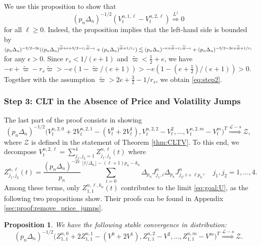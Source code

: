 \documentclass[ecta,nameyear,draft]{econsocart}
\newtheorem{prop}[theorem]{Proposition}
\def\wt{\widetilde}
\newcommand{\limL}{\stackrel{L^1}{\Longrightarrow}}
\newcommand{\1}{\mathbf 1}
\newcommand{\calL}{\mathcal{L}}
\newcommand{\calZ}{\mathcal{Z}}
\numberwithin{equation}{section}
\begin{document}
\begin{appendix}
We use this proposition to show that
\begin{equation}\label{eq:step2} 
	(p_n\Delta_n)^{-1/2} (V^{n,1,\ell}_t -   V^{n,2,\ell}_t) \limL 0
\end{equation}
for all $\ell \geq 0$. Indeed, the proposition implies that the left-hand side is bounded by
$
(p_n\Delta_n)^{-3/2-2e} 
(
	(p_n\Delta_n)^{\wt\varpi+e+3/2-r_s\wt\varpi - \epsilon}
	+
	(p_n\Delta_n)^{\wt \varpi+1/r_s}
)
 \lesssim
(p_n\Delta_n)^{-e+\wt\varpi-r_s\wt\varpi - \epsilon} 
+ \linebreak
(p_n\Delta_n)^{-3/2-2e+\wt \varpi+1/r_s}
$
for any $\epsilon > 0$. Since $r_s < 1/(e+1)$ and $\wt\varpi < \frac12+e$, we have $
-e+\wt\varpi-r_s\wt\varpi
> -e  ( 1 - \wt\varpi /({e+1})  )
> -e  ( 1 - (e+\frac12)/(e+1)  ) > 0
$. Together with the assumption $\wt \varpi > 2e+\frac32 -1/{r_s}$, we  obtain \eqref{eq:step2}.


\subsubsection*{Step 3: CLT in the Absence of Price and Volatility Jumps}

\noindent The last part of the proof consists in showing 
\begin{equation}
\label{eq:goal:U}
(p_n \Delta_n)^{-1/2}\Big(V^{n,2,0}_t+2
V^{n,2,1}_t - (V^0_t+2V^1_t),V^{n,2,2}_t-V^2_t,\dots,V^{n,2,m}_t-V^m_t
\Big)^T
\stackrel{\calL-s}{\Longrightarrow} \calZ,
\end{equation} 
where $\calZ$ is defined in the statement of Theorem \ref{thm:CLTV}.
To this end, we decompose
$
V^{n,2,\ell}_t
=
\sum_{j_1, j_2 =1}^{4} Z^{n,\ell}_{j_1, j_2}(t)
$
where  
\begin{equation*}
Z^{n,\ell}_{j_1, j_2}(t)
=
\frac{(p_n\Delta_n)^{-2e}}{p_n}
\sum_{i=0}^{\lfloor t/\Delta_n \rfloor - (\ell + 1) p_n-k_n}
\Delta_{p_n} J^{n}_{j_1, i}
\Delta_{p_n} J^{n}_{j_2, i + \ell p_n},\quad j_1, j_2 = 1, \dots, 4.
\end{equation*}
Among these terms, only $Z^{n,\ell, k_n}_{1, 1}(t)$  contributes to the limit \eqref{eq:goal:U}, as the following two propositions show. Their proofs can be found in Appendix \ref{sec:proof:remove_price_jumps}.
\begin{prop}
\label{prop:CLT:dominating}
We have the following stable convergence in distribution:
\begin{equation*}
(p_n \Delta_n)^{-1/2}\Big(
Z_{1,1}^{n,0}+2Z_{1,1}^{n,1}  - ( V^0+2V^1), Z_{1,1}^{n,2} - V^2,\ldots,Z_{1,1}^{n,m}- V^m
\Big)^T
\stackrel{\calL-s}{\Longrightarrow} \calZ.
\end{equation*}
\end{prop}


\end{appendix}
\end{document}
